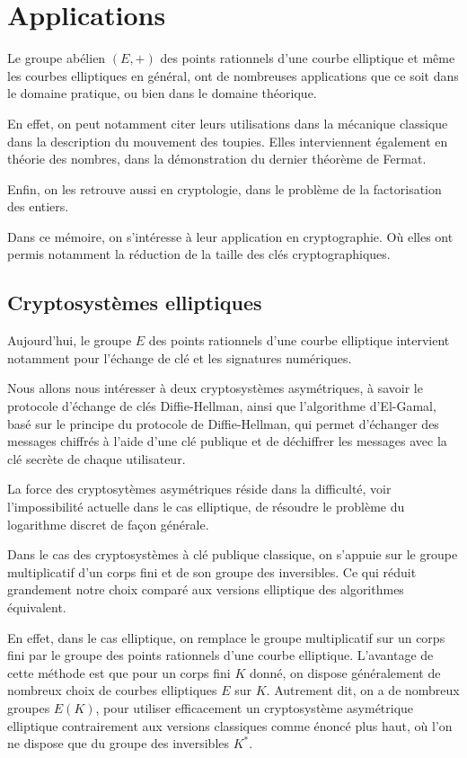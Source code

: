 \chapter{Applications}
Le groupe abélien $(E,+)$ des points rationnels d'une courbe elliptique et même les courbes elliptiques en général,
ont de nombreuses applications que ce soit dans le domaine pratique, ou bien dans le domaine
théorique.

En effet, on peut notamment citer leurs utilisations dans la mécanique classique dans la
description du mouvement des toupies. Elles interviennent également en théorie des nombres, dans la démonstration
du dernier théorème de Fermat.

Enfin, on les retrouve aussi en cryptologie, dans le problème de la factorisation des entiers.

Dans ce mémoire, on s'intéresse à leur application en cryptographie. Où elles ont
permis notamment la réduction de la taille des clés cryptographiques.

\section{Cryptosystèmes elliptiques}

Aujourd'hui, le groupe $E$ des points rationnels d'une courbe elliptique intervient notamment pour l'échange de clé
et les signatures numériques.

Nous allons nous intéresser à deux cryptosystèmes asymétriques, à savoir le protocole d'échange de
clés Diffie-Hellman, ainsi que l'algorithme d'El-Gamal, basé sur le principe du protocole de
Diffie-Hellman, qui permet d'échanger des messages chiffrés à l'aide d'une clé
publique et de déchiffrer les messages avec la clé secrète de chaque utilisateur.

La force des cryptosytèmes asymétriques réside dans la difficulté, voir l'impossibilité
actuelle dans le cas elliptique, de résoudre le problème du logarithme discret de façon
générale.

Dans le cas des cryptosystèmes à clé publique classique, on s'appuie sur le groupe multiplicatif d'un corps fini et de son groupe des inversibles. Ce qui réduit grandement notre choix comparé aux versions elliptique des algorithmes équivalent.

En effet, dans le cas elliptique, on remplace le groupe multiplicatif sur un corps fini par le
groupe des points rationnels d'une courbe elliptique. L'avantage de cette méthode est que pour
un corps fini  $K$ donné, on dispose généralement de nombreux choix de courbes elliptiques $E$
sur $K$. Autrement dit, on a de nombreux groupes $E(K)$, pour utiliser efficacement un
cryptosystème asymétrique elliptique contrairement aux versions classiques comme énoncé plus
haut, où
l'on ne dispose que du groupe des inversibles $K^{*}$.

